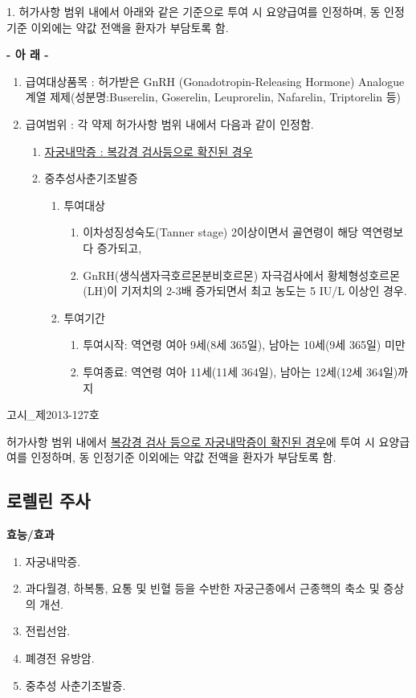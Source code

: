 {
\par
1. 허가사항 범위 내에서 아래와 같은 기준으로 투여 시 요양급여를 인정하며, 동 인정기준 이외에는 약값 전액을 환자가 부담토록 함. 
\begin{center}\textbf{- 아 래 -}\end{center}
\begin{enumerate}[가.]\tightlist
\item 급여대상품목 : 허가받은 GnRH (Gonadotropin-Releasing Hormone) Analogue 계열 제제(성분명:Buserelin, Goserelin, Leuprorelin, Nafarelin, Triptorelin 등) 
\item 급여범위 : 각 약제 허가사항 범위 내에서 다음과 같이 인정함. 
	\begin{enumerate}[1)]\tightlist
	\item \uline{자궁내막증 : 복강경 검사등으로 확진된 경우} 
	\item 중추성사춘기조발증 
		\begin{enumerate}[가)]\tightlist
		\item 투여대상 
			\begin{enumerate}[(1)]\tightlist
			\item 이차성징성숙도(Tanner stage) 2이상이면서 골연령이 해당 역연령보다 증가되고, 
			\item GnRH(생식샘자극호르몬분비호르몬) 자극검사에서 황체형성호르몬(LH)이 기저치의 2-3배 증가되면서 최고 농도는 5 IU/L 이상인 경우. 
			\end{enumerate}
		\item 투여기간
			\begin{enumerate}[(1)]\tightlist
			\item 투여시작: 역연령 여아 9세(8세 365일), 남아는 10세(9세 365일) 미만 
			\item 투여종료: 역연령 여아 11세(11세 364일), 남아는 12세(12세 364일)까지 
			\end{enumerate}
		\end{enumerate}
	\end{enumerate}
\end{enumerate}

고시_제2013-127호\par
허가사항 범위 내에서 \uline{복강경 검사 등으로 자궁내막증이 확진된 경우}에 투여 시 요양급여를 인정하며, 동 인정기준 이외에는 약값 전액을 환자가 부담토록 함.


\subsection{로렐린 주사}
\textbf{효능/효과}
\begin{enumerate}[1.]\tightlist
\item 자궁내막증. 
\item 과다월경, 하복통, 요통 및 빈혈 등을 수반한 자궁근종에서 근종핵의 축소 및 증상의 개선. 
\item 전립선암. 
\item 폐경전 유방암. 
\item 중추성 사춘기조발증.
\end{enumerate}

}
